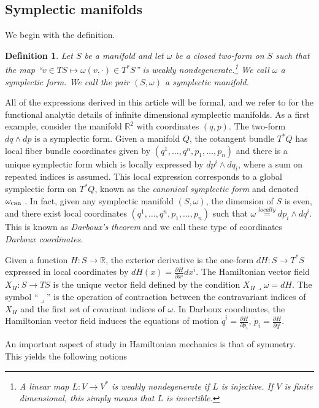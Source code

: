 \documentclass[12pt]{amsart}
\newcommand{\pder}[2]{\ensuremath{\frac{\partial #1}{\partial #2}}}
\newcommand{\R}{\ensuremath{\mathbb{R}}}
\newtheorem{defn}[thm]{Definition}
\begin{document}
\subsection{Symplectic manifolds}
\label{sec:Symplectic}
We begin with the definition.
\begin{defn}
  Let $S$ be a manifold
  and let $\omega$ be a closed two-form on $S$ such that the map
  ``$v \in TS \mapsto \omega( v , \cdot ) \in T^*S$'' is weakly nondegenerate.\footnote{
    A linear map $L:V \to V^*$ is \emph{weakly nondegenerate} if $L$ is injective.  If $V$ is finite dimensional, this simply means that $L$ is invertible.}
  We call $\omega$ a \emph{symplectic form}.
  We call the pair $(S,\omega)$ a \emph{symplectic manifold}.
\end{defn}
All of the expressions derived in this article will be formal, and we refer to \cite{Gay-BalmazVizman2011}
for the functional analytic details of infinite dimensional symplectic manifolds.
As a first example, consider the manifold $\R^2$
with coordinates $(q,p)$.
The two-form $dq \wedge dp$ is a symplectic form.
Given a manifold $Q$,
the cotangent bundle $T^*Q$ has local fiber bundle coordinates
given by $(q^1,\dots, q^n,p_1,\dots,p_n)$ and there is a unique symplectic form
which is locally expressed by $dp^i \wedge dq_i$, where
a sum on repeated indices is assumed.
This local expression corresponds to a global symplectic
form on $T^*Q$, known as the \emph{canonical symplectic form}
and denoted $\omega_{\rm can}$ \cite[Theorem 3.2.10]{FOM}.
In fact, given any symplectic manifold $(S,\omega)$, the dimension of $S$
is even, and there exist local coordinates $(q^1,\dots,q^n,p_1,\dots,p_n)$
such that $\omega \stackrel{locally}{=} dp_i \wedge dq^i$.
This is known as \emph{Darboux's theorem} and we call these type of
coordinates \emph{Darboux coordinates}\cite[Theorem 3.2.2]{FOM}.

Given a function $H:S \to \mathbb{R}$,
the exterior derivative is the one-form $dH:S \to T^*S$
expressed in local coordinates by $dH(x) = \pder{H}{x^i} dx^i$.
The Hamiltonian vector field $X_H:S \to TS$ is the unique vector
field defined by the condition
$
  X_H \lrcorner \omega = dH.
$
The symbol ``$\lrcorner$'' is the operation of contraction between
the contravariant indices of $X_H$ and the first set of covariant
indices of $\omega$.
In Darboux coordinates, the Hamiltonian vector field induces the
equations of motion $\dot{q}^i = \pder{H}{p_i}$, $\dot{p}_i = \pder{H}{q^i}$.


An important aspect of study in Hamiltonian mechanics is that of symmetry.
This yields the following notions
\end{document}
